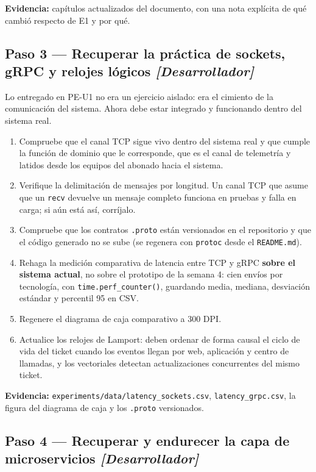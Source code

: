 \documentclass[11pt,a4paper]{article}
\newcommand{\paso}[1]{\subsection{#1}}
\begin{document}
	\textbf{Evidencia:} capítulos actualizados del documento, con una nota explícita de qué cambió respecto de E1 y por qué.
	
	\paso{Paso 3 --- Recuperar la práctica de sockets, gRPC y relojes lógicos \emph{[Desarrollador]}}
	
	Lo entregado en PE-U1 no era un ejercicio aislado: era el cimiento de la comunicación del sistema. Ahora debe estar integrado y funcionando dentro del sistema real.
	
	\begin{enumerate}[leftmargin=*,itemsep=4pt]
		\item Compruebe que el canal TCP sigue vivo dentro del sistema real y que cumple la función de dominio que le corresponde, que es el canal de telemetría y latidos desde los equipos del abonado hacia el sistema.
		\item Verifique la delimitación de mensajes por longitud. Un canal TCP que asume que un \texttt{recv} devuelve un mensaje completo funciona en pruebas y falla en carga; si aún está así, corríjalo.
		\item Compruebe que los contratos \texttt{.proto} están versionados en el repositorio y que el código generado no se sube (se regenera con \texttt{protoc} desde el \texttt{README.md}).
		\item Rehaga la medición comparativa de latencia entre TCP y gRPC \textbf{sobre el sistema actual}, no sobre el prototipo de la semana 4: cien envíos por tecnología, con \texttt{time.perf\_counter()}, guardando media, mediana, desviación estándar y percentil 95 en CSV.
		\item Regenere el diagrama de caja comparativo a 300 DPI.
		\item Actualice los relojes de Lamport: deben ordenar de forma causal el ciclo de vida del ticket cuando los eventos llegan por web, aplicación y centro de llamadas, y los vectoriales detectan actualizaciones concurrentes del mismo ticket.
	\end{enumerate}
	
	\textbf{Evidencia:} \texttt{experiments/data/latency\_sockets.csv}, \texttt{latency\_grpc.csv}, la figura del diagrama de caja y los \texttt{.proto} versionados.
	
	\paso{Paso 4 --- Recuperar y endurecer la capa de microservicios \emph{[Desarrollador]}}
	
\end{document}
